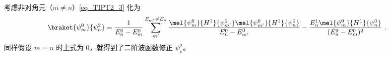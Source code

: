 考虑非对角元（$m\ne n$）\autoref{eq_TIPT2_3} 化为
\begin{equation}
\braket{\psi_m^0}{\psi_n^2} =
\frac{1}{E_n^0-E_m^0}\sum_{m'}^{E_{m'}\ne E_n}\frac{\mel{\psi_m^0}{H^1}{\psi_{m'}^0}\mel{\psi_{m'}^0}{H^1}{\psi_n^0}}{E_n^0 - E_{m'}^0} - \frac{E_n^1\mel{\psi_m^0}{H^1}{\psi_n^0}}{(E_n^0 - E_m^0)^2}~.
\end{equation}
同样假设 $m=n$ 时上式为 0，就得到了二阶波函数修正 $\psi_n^2$。
